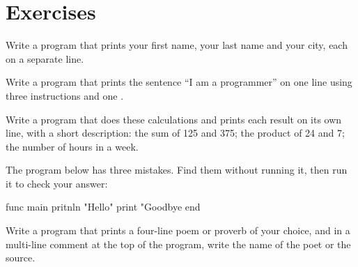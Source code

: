 \section*{Exercises}

\exercise Write a program that prints your first name, your last name and
your city, each on a separate line.

\exercise Write a program that prints the sentence ``I am a programmer'' on
one line using three  instructions and one .

\exercise Write a program that does these calculations and prints each
result on its own line, with a short description: the sum of 125 and 375;
the product of 24 and 7; the number of hours in a week.

\exercise The program below has three mistakes. Find them without running
it, then run it to check your answer:
\begin{salamcode}
func main
    pritnln "Hello"
    print "Goodbye
end
\end{salamcode}

\exercise Write a program that prints a four-line poem or proverb of your
choice, and in a multi-line comment at the top of the program, write the
name of the poet or the source.

